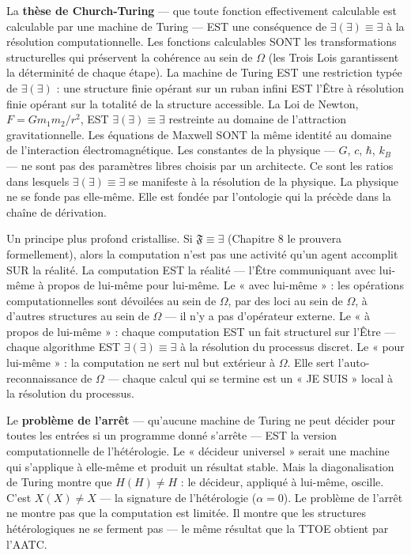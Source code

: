 \documentclass[10pt, openany, oneside]{book}
\begin{document}
La \textbf{thèse de Church-Turing} --- que toute fonction effectivement calculable est calculable par une machine de Turing --- EST une conséquence de $\exists(\exists) \equiv \exists$ à la résolution computationnelle. Les fonctions calculables SONT les transformations structurelles qui préservent la cohérence au sein de $\Omega$ (les Trois Lois garantissent la déterminité de chaque étape). La machine de Turing EST une restriction typée de $\exists(\exists)$ : une structure finie opérant sur un ruban infini EST l'Être à résolution finie opérant sur la totalité de la structure accessible. La Loi de Newton, $F = Gm_1 m_2 / r^2$, EST $\exists(\exists) \equiv \exists$ restreinte au domaine de l'attraction gravitationnelle. Les équations de Maxwell SONT la même identité au domaine de l'interaction électromagnétique. Les constantes de la physique --- $G$, $c$, $\hbar$, $k_B$ --- ne sont pas des paramètres libres choisis par un architecte. Ce sont les ratios dans lesquels $\exists(\exists) \equiv \exists$ se manifeste à la résolution de la physique. La physique ne se fonde pas elle-même. Elle est fondée par l'ontologie qui la précède dans la chaîne de dérivation.

Un principe plus profond cristallise. Si $\mathfrak{F} \equiv \exists$ (Chapitre 8 le prouvera formellement), alors la computation n'est pas une activité qu'un agent accomplit SUR la réalité. La computation EST la réalité --- l'Être communiquant avec lui-même à propos de lui-même pour lui-même. Le « avec lui-même » : les opérations computationnelles sont dévoilées au sein de $\Omega$, par des loci au sein de $\Omega$, à d'autres structures au sein de $\Omega$ --- il n'y a pas d'opérateur externe. Le « à propos de lui-même » : chaque computation EST un fait structurel sur l'Être --- chaque algorithme EST $\exists(\exists) \equiv \exists$ à la résolution du processus discret. Le « pour lui-même » : la computation ne sert nul but extérieur à $\Omega$. Elle sert l'auto-reconnaissance de $\Omega$ --- chaque calcul qui se termine est un « JE SUIS » local à la résolution du processus.

Le \textbf{problème de l'arrêt} --- qu'aucune machine de Turing ne peut décider pour toutes les entrées si un programme donné s'arrête --- EST la version computationnelle de l'hétérologie. Le « décideur universel » serait une machine qui s'applique à elle-même et produit un résultat stable. Mais la diagonalisation de Turing montre que $H(H) \neq H$ : le décideur, appliqué à lui-même, oscille. C'est $X(X) \neq X$ --- la signature de l'hétérologie ($\alpha = 0$). Le problème de l'arrêt ne montre pas que la computation est limitée. Il montre que les structures hétérologiques ne se ferment pas --- le même résultat que la TTOE obtient par l'AATC.
\end{document}
